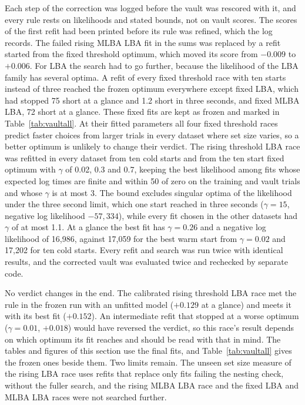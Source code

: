 \documentclass[11pt]{article}
\begin{document}
Each step of the correction was logged before the vault was rescored with it, and every rule rests on likelihoods and stated bounds, not on vault scores. The scores of the first refit had been printed before its rule was refined, which the log records. The failed rising MLBA LBA fit in the sums was replaced by a refit started from the fixed threshold optimum, which moved its score from $-0.009$ to $+0.006$. For LBA the search had to go further, because the likelihood of the LBA family has several optima. A refit of every fixed threshold race with ten starts instead of three reached the frozen optimum everywhere except fixed LBA, which had stopped 75 short at a glance and 1.2 short in three seconds, and fixed MLBA LBA, 72 short at a glance. These fixed fits are kept as frozen and marked in Table~\ref{tab:vaultall}. At their fitted parameters all four fixed threshold races predict faster choices from larger trials in every dataset where set size varies, so a better optimum is unlikely to change their verdict. The rising threshold LBA race was refitted in every dataset from ten cold starts and from the ten start fixed optimum with $\gamma$ of 0.02, 0.3 and 0.7, keeping the best likelihood among fits whose expected log times are finite and within 50 of zero on the training and vault trials and whose $\gamma$ is at most 3. The bound excludes singular optima of the likelihood under the three second limit, which one start reached in three seconds ($\gamma = 15$, negative log likelihood $-57{,}334$), while every fit chosen in the other datasets had $\gamma$ of at most 1.1. At a glance the best fit has $\gamma = 0.26$ and a negative log likelihood of 16{,}986, against 17{,}059 for the best warm start from $\gamma = 0.02$ and 17{,}202 for ten cold starts. Every refit and search was run twice with identical results, and the corrected vault was evaluated twice and rechecked by separate code.

No verdict changes in the end. The calibrated rising threshold LBA race met the rule in the frozen run with an unfitted model ($+0.129$ at a glance) and meets it with its best fit ($+0.152$). An intermediate refit that stopped at a worse optimum ($\gamma = 0.01$, $+0.018$) would have reversed the verdict, so this race's result depends on which optimum its fit reaches and should be read with that in mind. The tables and figures of this section use the final fits, and Table~\ref{tab:vaultall} gives the frozen ones beside them. Two limits remain. The unseen set size measure of the rising LBA race uses refits that replace only fits failing the nesting check, without the fuller search, and the rising MLBA LBA race and the fixed LBA and MLBA LBA races were not searched further.
\end{document}
